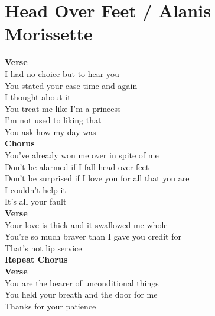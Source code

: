 \section{Head Over Feet / Alanis Morissette}\label{sec:headoverfeet}
  
\Cmajor
\Gmajor
\Aminor
\Fmajor
\DmajorEasy
\Bminor
\Amajor
 
\textbf{Verse}\\
I had no choice but to hear you\\
You stated your case time and again\\
I thought about it\\
You treat me like I'm a princess\\
I'm not used to  liking that\\
You ask how my day was \\
\textbf{Chorus}\\
You've already won me over in spite of me\\
Don't be alarmed if I fall head over feet\\
Don't be surprised if I love you for all that you are\\
I couldn't help it\\
It's all your fault\\
\textbf{Verse}\\
Your love is thick and it swallowed me whole\\
You're so much braver than I gave you credit for\\
That's not lip service\\
\textbf{Repeat Chorus}\\
\textbf{Verse}\\
You are the bearer of unconditional things\\
You held your breath and the door for me\\
Thanks for your patience\\

